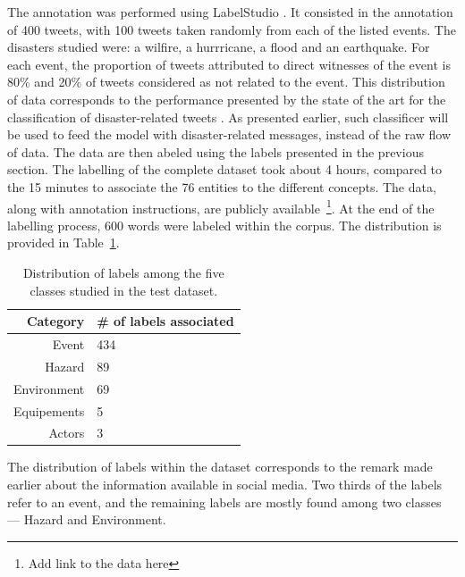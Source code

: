 The annotation was performed using LabelStudio \parencite{tkachenkoLabelStudioData2020}.
It consisted in the annotation of 400 tweets, with 100 tweets taken randomly from each of the listed events.
The disasters studied were: a wilfire, a hurrricane, a flood and an earthquake.
For each event, the proportion of tweets attributed to direct witnesses of the event is 80\% and 20\% of tweets considered as not related to the event.
This distribution of data corresponds to the performance presented by the state of the art
for the classification of disaster-related tweets \parencite{xukunImprovingDisasterrelatedTweet2020}.
As presented earlier, such classificer will be used to feed the model with disaster-related
messages, instead of the raw flow of data.
The data are then abeled using the labels presented in the previous section.
The labelling of the complete dataset took about 4 hours, compared to the 15 minutes to
associate the 76 entities to the different concepts.
The data, along with annotation instructions, are publicly available~\footnote{Add link to the data here}.
At the end of the labelling process, 600 words were labeled within the corpus.
The distribution is provided in Table~\ref{table:labels-distribution}.

\begin{table}[bp]
    \centering
    \caption{Distribution of labels among the five classes studied in the test dataset.}
    \begin{tabular}{rl}
        Category    & \# of labels associated \\
        \toprule
        Event       & 434                     \\
        Hazard      & 89                      \\
        Environment & 69                      \\
        Equipements & 5                       \\
        Actors      & 3                       \\
        \bottomrule
    \end{tabular}
    \label{table:labels-distribution}
\end{table}

The distribution of labels within the dataset corresponds to the remark made earlier about
the information available in social media.
Two thirds of the labels refer to an event, and the remaining labels are mostly found among
two classes — Hazard and Environment.

